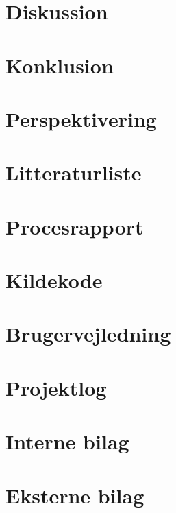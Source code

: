 \documentclass[12pt]{report}
\begin{document}
\chapter{Diskussion}







\chapter{Konklusion}






\chapter{Perspektivering}






\chapter{Litteraturliste}

\pagebreak






\chapter{Procesrapport}








\chapter{Kildekode}








\chapter{Brugervejledning}








\chapter{Projektlog}

\pagebreak







\chapter{Interne bilag}








\chapter{Eksterne bilag}

\end{document}
